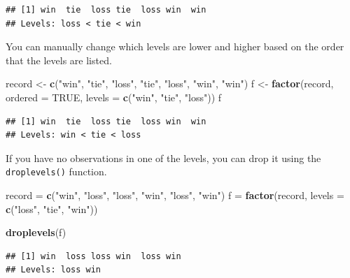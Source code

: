 \documentclass[
]{book}
\newenvironment{Shaded}{\begin{snugshade}}{\end{snugshade}}
\newcommand{\DataTypeTok}[1]{\textcolor[rgb]{0.13,0.29,0.53}{#1}}
\newcommand{\KeywordTok}[1]{\textcolor[rgb]{0.13,0.29,0.53}{\textbf{#1}}}
\newcommand{\NormalTok}[1]{#1}
\newcommand{\OtherTok}[1]{\textcolor[rgb]{0.56,0.35,0.01}{#1}}
\newcommand{\StringTok}[1]{\textcolor[rgb]{0.31,0.60,0.02}{#1}}
\begin{document}
\begin{verbatim}
## [1] win  tie  loss tie  loss win  win 
## Levels: loss < tie < win
\end{verbatim}

You can manually change which levels are lower and higher based on the order that the levels are listed.

\begin{Shaded}
\begin{Highlighting}[]
\NormalTok{record <-}\StringTok{ }\KeywordTok{c}\NormalTok{(}\StringTok{"win"}\NormalTok{, }\StringTok{"tie"}\NormalTok{,}
    \StringTok{"loss"}\NormalTok{, }\StringTok{"tie"}\NormalTok{, }\StringTok{"loss"}\NormalTok{,}
    \StringTok{"win"}\NormalTok{, }\StringTok{"win"}\NormalTok{)}
\NormalTok{f <-}\StringTok{ }\KeywordTok{factor}\NormalTok{(record, }\DataTypeTok{ordered =} \OtherTok{TRUE}\NormalTok{,}
    \DataTypeTok{levels =} \KeywordTok{c}\NormalTok{(}\StringTok{"win"}\NormalTok{,}
        \StringTok{"tie"}\NormalTok{, }\StringTok{"loss"}\NormalTok{))}
\NormalTok{f}
\end{Highlighting}
\end{Shaded}

\begin{verbatim}
## [1] win  tie  loss tie  loss win  win 
## Levels: win < tie < loss
\end{verbatim}

If you have no observations in one of the levels, you can drop it using the \texttt{droplevels()} function.

\begin{Shaded}
\begin{Highlighting}[]
\NormalTok{record =}\StringTok{ }\KeywordTok{c}\NormalTok{(}\StringTok{"win"}\NormalTok{, }\StringTok{"loss"}\NormalTok{,}
    \StringTok{"loss"}\NormalTok{, }\StringTok{"win"}\NormalTok{, }\StringTok{"loss"}\NormalTok{,}
    \StringTok{"win"}\NormalTok{)}
\NormalTok{f =}\StringTok{ }\KeywordTok{factor}\NormalTok{(record, }\DataTypeTok{levels =} \KeywordTok{c}\NormalTok{(}\StringTok{"loss"}\NormalTok{,}
    \StringTok{"tie"}\NormalTok{, }\StringTok{"win"}\NormalTok{))}

\KeywordTok{droplevels}\NormalTok{(f)}
\end{Highlighting}
\end{Shaded}

\begin{verbatim}
## [1] win  loss loss win  loss win 
## Levels: loss win
\end{verbatim}
\end{document}
